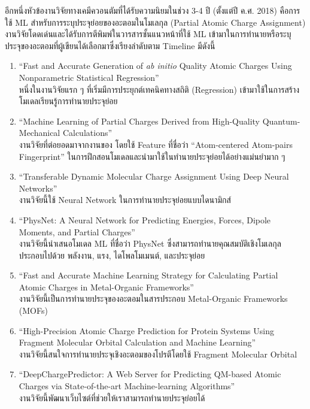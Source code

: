 อีกหนึ่งหัวข้องานวิจัยทางเคมีควอนตัมที่ได้รับความนิยมในช่วง 3-4 ปี (ตั้งแต่ปี ค.ศ. 2018) คือการใช้ ML สำหรับการระบุประจุย่อยของอะตอมในโมเลกุล (Partial Atomic Charge Assignment) งานวิจัยโดดเด่นและได้รับการตีพิมพ์ในวารสารชั้นแนวหน้าที่ใช้ ML เข้ามาในการทำนายหรือระบุประจุของอะตอมที่ผู้เขียนได้เลือกมาซึ่งเรียงลำดับตาม Timeline มีดังนี้
%
\begin{enumerate}[topsep=0pt,noitemsep]\setlength\itemsep{0.5em}
    \item \enquote{Fast and Accurate Generation of \textit{ab initio} Quality Atomic Charges Using Nonparametric Statistical Regression}\autocite{rai2013} \\ 
    หนึ่งในงานวิจัยแรก ๆ ที่เริ่มมีการประยุกต์เทคนิคทางสถิติ (Regression) เข้ามาใช้ในการสร้างโมเดลเรียนรู้การทำนายประจุย่อย

    \item \enquote{Machine Learning of Partial Charges Derived from High-Quality Quantum-Mechanical Calculations}\autocite{bleiziffer2018} \\ 
    งานวิจัยที่ต่อยอดมาจากงานของ โดยใช้ Feature ที่ชื่อว่า \enquote{Atom-centered Atom-pairs Fingerprint}\autocite{carhart1985} ในการฝึกสอนโมเดลและนำมาใช้ในทำนายประจุย่อยได้อย่างแม่นยำมาก ๆ

    \item \enquote{Transferable Dynamic Molecular Charge Assignment Using Deep Neural Networks}\autocite{nebgen2018} \\ 
    งานวิจัยนี้ใช้ Neural Network ในการทำนายประจุย่อยแบบไดนามิกส์

    \item \enquote{PhysNet: A Neural Network for Predicting Energies, Forces, Dipole Moments, and Partial Charges} \autocite{unke2019} \\ 
    งานวิจัยนี้นำเสนอโมเดล ML ที่ชื่อว่า PhysNet ซึ่งสามารถทำนายคุณสมบัติเชิงโมเลกุล ประกอบไปด้วย พลังงาน, แรง, ไดโพลโมเมนต์, และประจุย่อย

    \item \enquote{Fast and Accurate Machine Learning Strategy for Calculating Partial Atomic Charges in Metal-Organic Frameworks}\autocite{kancharlapalli2021} \\
    งานวิจัยนี้เป็นการทำนายประจุของอะตอมในสารประกอบ Metal-Organic Frameworks (MOFs)

    \item \enquote{High-Precision Atomic Charge Prediction for Protein Systems Using Fragment Molecular Orbital Calculation and Machine Learning}\autocite{kato2020} \\ 
    งานวิจัยนี้สนใจการทำนายประจุเชิงอะตอมของโปรตีโดยใช้ Fragment Molecular Orbital

    \item \enquote{DeepChargePredictor: A Web Server for Predicting QM-based Atomic Charges via State-of-the-art Machine-learning Algorithms}\autocite{wang2021} \\ 
    งานวิจัยนี้พัฒนาเว็บไซต์ที่ช่วยให้เราสามารถทำนายประจุย่อยได้
\end{enumerate}

